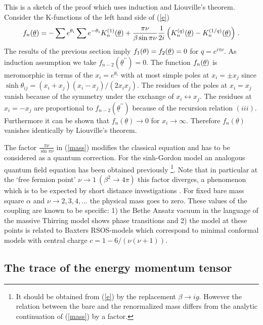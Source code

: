 \documentclass[a4paper,12pt]{article}
\begin{document}
This is a sketch of the proof \cite{BK2} which uses induction and Liouville's
theorem. Consider the K-functions of the left hand side of (\ref{e}) 
\[
f_{n}(\underline{\theta })=-\sum e^{\theta _{i}}\sum e^{-\theta
_{i}}K_{n}^{(1)}(\underline{\theta })+\frac{\pi \nu }{\beta \sin \pi \nu }%
\frac{1}{2i}\left( K_{n}^{(q)}(\underline{\theta })-K_{n}^{(1/q)}(\underline{%
\theta })\right) \,. 
\]
The results of the previous section imply $f_{1}(\theta )=f_{2}(\underline{%
\theta })=0$ for $q=e^{i\pi \nu }$. As induction assumption we take $f_{n-2}(%
\underline{\theta }^{\prime \prime })=0$. The function $f_{n}(\underline{%
\theta })$ is meromorphic in terms of the $x_{i}=e^{\theta _{i}}$ with at
most simple poles at $x_{i}=\pm x_{j}$ since $\sinh \theta
_{ij}=(x_{i}+x_{j})(x_{i}-x_{j})/(2x_{i}x_{j})$. The residues of the poles
at $x_{i}=x_{j}$ vanish because of the symmetry under the exchange of $%
x_{i}\leftrightarrow x_{j}$. The residues at $x_{i}=-x_{j}$ are proportional
to $f_{n-2}(\underline{\theta }^{\prime \prime })$ because of the recursion
relation $(iii)$. Furthermore it can be shown \cite{BK2} that $f_{n}(%
\underline{\theta })\rightarrow 0$ for $x_{i}\rightarrow \infty $. Therefore 
$f_{n}(\underline{\theta })$ vanishes identically by Liouville's theorem.

The factor $\frac{\pi \nu }{\sin \pi \nu }$ in (\ref{mass}) modifies the
classical equation and has to be considered as a quantum correction. For the
sinh-Gordon model an analogous quantum field equation has been obtained
previously \cite{MS}\footnote{%
It should be obtained from (\ref{e}) by the replacement $\beta \rightarrow
ig $. However the relation between the bare and the renormalized mass
differs from the analytic continuation of (\ref{mass}) by a factor.}. Note
that in particular at the `free fermion point' $\nu \rightarrow 1~(\beta
^{2}\rightarrow 4\pi )$ this factor diverges, a phenomenon which is to be
expected by short distance investigations \cite{ST}. For fixed bare mass
square $\alpha $ and $\nu \rightarrow 2,3,4,\dots $ the physical mass goes
to zero. These values of the coupling are known to be specific: 1) the Bethe
Ansatz vacuum in the language of the massive Thirring model shows phase
transitions \cite{Ko} and 2) the model at these points is related \cite
{K3,LeC,Sm1} to Baxters RSOS-models which correspond to minimal conformal
models with central charge $c=1-6/(\nu (\nu +1))$.

\subsection*{The trace of the energy momentum tensor}
\end{document}
